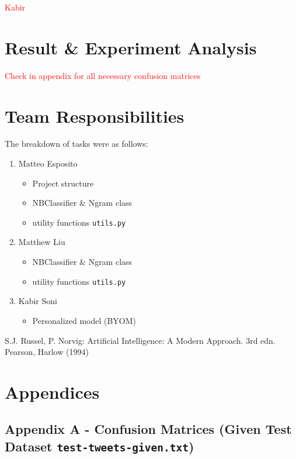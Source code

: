 \documentclass[runningheads]{llncs}
\newcommand{\code}[1]{\texttt{#1}}
\begin{document}
\textcolor{red}{Kabir}

\section{Result \& Experiment Analysis}

\textcolor{red}{Check in appendix for all necessary confusion matrices}

\section{Team Responsibilities}

The breakdown of tasks were as follows:

\begin{enumerate}
    \item Matteo Esposito
    \begin{itemize}
        \item Project structure
        \item NBClassifier \& Ngram class
        \item utility functions \code{utils.py}
    \end{itemize}
    \item Matthew Liu
    \begin{itemize}
        \item NBClassifier \& Ngram class
        \item utility functions \code{utils.py}
    \end{itemize}
    \item Kabir Soni
    \begin{itemize}
        \item Personalized model (BYOM)
    \end{itemize}
\end{enumerate}

\begin{thebibliography}{8}
    
S.J. Russel, P. Norvig: Artificial Intelligence: A Modern Approach. 3rd edn. Pearson, Harlow (1994)

\end{thebibliography}

\section{Appendices}
\subsection{Appendix A - Confusion Matrices (Given Test Dataset \code{test-tweets-given.txt})}
\end{document}
